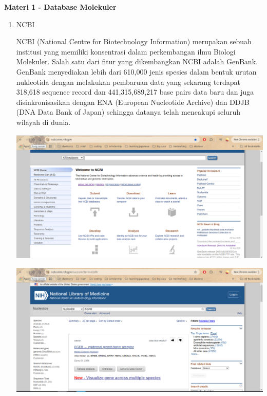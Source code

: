 \documentclass{article}
\begin{document}
    \begin{flushleft}
        \textbf{Materi 1 - Database Molekuler}
        \newline

        \begin{enumerate}
            \item NCBI
            
            NCBI (National Centre for Biotechnology Information) merupakan sebuah
            institusi yang memiliki konsentrasi dalam perkembangan ilmu Biologi Molekuler.
            Salah satu dari fitur yang dikembangkan NCBI adalah GenBank. GenBank menyediakan lebih dari 610,000 jenis spesies dalam bentuk urutan nukleotida dengan melakukan pembaruan data yang sekarang terdapat 318,618 sequence record dan 441,315,689,217 base pairs data baru dan juga disinkronisasikan dengan ENA (European Nucleotide Archive) dan DDJB (DNA Data Bank of Japan) sehingga datanya telah mencakupi seluruh wilayah di dunia.
            \par\vspace{0.5cm} 
            \includegraphics[scale=0.3]{Modul1/img/1.png}
           
            \includegraphics[scale=0.3]{Modul1/img/2.png}


\end{enumerate}
\end{flushleft}
\end{document}
